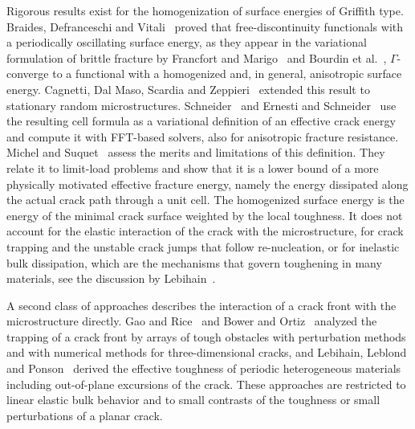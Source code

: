 \documentclass[pdflatex,sn-mathphys-num]{sn-jnl}%
\theoremstyle{thmstyleone}%
\theoremstyle{thmstyletwo}%
\theoremstyle{thmstylethree}%
\begin{document}
Rigorous results exist for the homogenization of surface energies of Griffith type. Braides, Defranceschi and Vitali~\cite{braides_homogenization_1996} proved that free-discontinuity functionals with a periodically oscillating surface energy, as they appear in the variational formulation of brittle fracture by Francfort and Marigo~\cite{francfort_revisiting_1998} and Bourdin et al.~\cite{bourdin_variational_2008}, $\Gamma$-converge to a functional with a homogenized and, in general, anisotropic surface energy. Cagnetti, Dal Maso, Scardia and Zeppieri~\cite{cagnetti_stochastic_2019} extended this result to stationary random microstructures. Schneider~\cite{schneider_fftbased_2020} and Ernesti and Schneider~\cite{ernesti_fast_2021,ernesti_computing_2022} use the resulting cell formula as a variational definition of an effective crack energy and compute it with FFT-based solvers, also for anisotropic fracture resistance. Michel and Suquet~\cite{michel_merits_2022} assess the merits and limitations of this definition. They relate it to limit-load problems and show that it is a lower bound of a more physically motivated effective fracture energy, namely the energy dissipated along the actual crack path through a unit cell. The homogenized surface energy is the energy of the minimal crack surface weighted by the local toughness. It does not account for the elastic interaction of the crack with the microstructure, for crack trapping and the unstable crack jumps that follow re-nucleation, or for inelastic bulk dissipation, which are the mechanisms that govern toughening in many materials, see the discussion by Lebihain~\cite{lebihain_brittle_2021}.

A second class of approaches describes the interaction of a crack front with the microstructure directly. Gao and Rice~\cite{gao_firstorder_1989} and Bower and Ortiz~\cite{bower_threedimensional_1991} analyzed the trapping of a crack front by arrays of tough obstacles with perturbation methods and with numerical methods for three-dimensional cracks, and Lebihain, Leblond and Ponson~\cite{lebihain_effective_2020} derived the effective toughness of periodic heterogeneous materials including out-of-plane excursions of the crack. These approaches are restricted to linear elastic bulk behavior and to small contrasts of the toughness or small perturbations of a planar crack.
\end{document}
